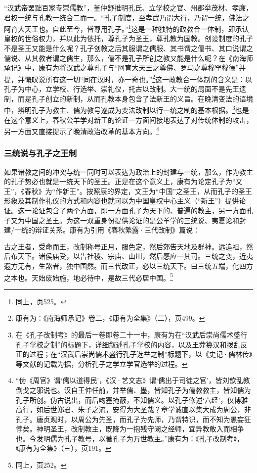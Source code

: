 \documentclass[a4paper, 12pt, openright]{ctexbook}
\renewenvironment{quote}
  {\list{}{\rightmargin2\ccwd \leftmargin2\ccwd \itemindent=2\ccwd \listparindent=2\ccwd}%
   \item\relax\small\kaishu\color{black}}
  {\endlist}
\begin{document}
“汉武帝罢黜百家专崇儒教”，董仲舒推明孔氏、立学校之官、州郡举茂材、孝廉，君权一统与孔教一统合二而一。“孔子制度，至孝武乃谓大行，乃谓一统，佛法之阿育大天王也。自此至今，皆尊用孔子。”\footnote{同上，页525。}这是一种独特的政教合一体制，即承认皇权的世俗权力，并以此为依托，尊孔子为圣王，尊孔教为国教。创设制度的孔子不是圣王又能是什么呢？孔子创教之后其服谓之儒服、其书谓之儒书、其口说谓之儒说、从其教者谓之儒生，那么，儒不是孔子所创之教又能是什么呢？在《南海师承记》中，康有为将汉武之尊孔子与“阿育大天王之尊佛、罗马之尊穆罕穆德”并提，并慨叹说所有这一切“同在汉时，亦一奇也。”\footnote{康有为：《南海师承记》卷二，《康有为全集》（二），页499。}这一政教合一体制的含义是：以孔子为中心，立学校、行选举、崇礼仪，托古以改制。大一统的局面不是先王遗制，而是孔子创立的新制，从而孔教本身包含了法新王的义旨。在晚清变法的语境中，辨明孔子为教主、儒为教号遂成为变法改制以行一统之制的基本根据。\footnote{在《孔子改制考》的最后一卷即卷二十一中，康有为在“汉武后崇尚儒术盛行孔子学校之制”的标题下，详细叙述孔子学校的内容，以及王莽篡汉和拨乱反正的过程；在“汉武后崇尚儒术盛行孔子选举之制”标题下，以《史记·儒林传》等文献的记载为据，分析孔子之学立学官选举的过程。}也是在这个意义上，春秋公羊学对新王的论证一方面间接地表达了对传统体制的攻击，另一方面又直接提示了晚清政治改革的基本方向。\footnote{“伪《周官》谓‘儒以道得民’，《汉·艺文志》谓‘儒出于司徒之官’，皆刘歆乱教倒戈之邪说也。汉自王仲任前，并举儒、墨，皆知孔子为儒教教主，皆知儒为孔子所创。伪古说出，而后吻塞掩蔽，不知儒义。以孔子修述‘六经’，仅博雅高行，如后世郑君、朱子之流，安得为大圣哉？章学诚直以集大成为周公，非孔子。唐贞观时，以周公为先圣，而孔子为先师，乃谓特识，而不知为愚妄狂悖矣。神明圣王，改制教主，既降为一抱残守阙之经师，宜异教敢入而相争也。今发明儒为孔子教号，以著孔子为万世教主。”康有为：《孔子改制考》，《康有为全集》（三），页191。}

\subsubsection{三统说与孔子之王制}

如果诸教之间的冲突与统一同时可以表达为政治上的封建与一统，那么，作为教主的孔子势必也就是一统天下的圣王。正是在这个意义上，康有为论定孔子为“文王”，《春秋》为“作新王”。按照康的界定，文王为“中国”之圣王，从而孔子的圣王形象及其制作礼仪的方式和内容也就可以为中国皇权中心主义（“新王”）提供论证。这一论证包含了两个方面，即一方面孔子为天下的、普遍的教主，另一方面孔子又为中国之圣王。为这一双重身份提供论证的是公羊学的三统说、夷夏论和封建/一统的辩证关系。康有为引用《春秋繁露·三代改制》篇说：

\begin{quote}
古之王者，受命而王，改制称号正月，服色定，然后郊告天地及群神。远追祖，然后布天下。诸侯庙受，以告社稷、宗庙、山川，然后感应一其司。三统之变，近夷遐方无有，生煞者，独中国然。而三代改正，必以三统天下。曰三统五端，化四方之本也。天始废始施，地必待中，是故三代必居中国。\footnote{同上，页252。}
\end{quote}
\end{document}
